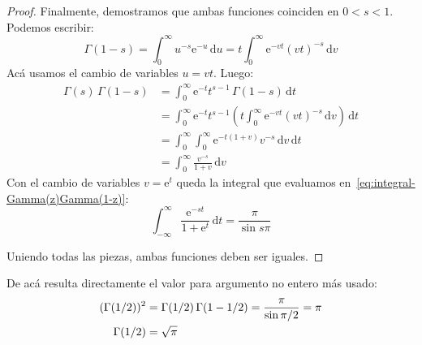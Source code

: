 \begin{proof}
    Finalmente,
    demostramos que ambas funciones coinciden en \(0 < s < 1\).
    Podemos escribir:
    \begin{equation*}
      \Gamma(1 - s)
	= \int_0^\infty u^{-s} \mathrm{e}^{-u} \, \mathrm{d} u
	= t \int_0^\infty \mathrm{e}^{-v t} (v t)^{-s}
	      \, \mathrm{d} v
    \end{equation*}
    Acá usamos el cambio de variables \(u = v t\).
    Luego:
    \begin{align*}
      \Gamma(s) \, \Gamma(1 - s)
	&= \int_0^\infty
	       \mathrm{e}^{-t} t^{s - 1} \, \Gamma(1 - s)
	     \, \mathrm{d} t \\
	&= \int_0^\infty
	     \mathrm{e}^{-t} t^{s - 1}
	       \left(
		 t \int_0^\infty \mathrm{e}^{- v t} (v t)^{-s}
		     \, \mathrm{d} v
	       \right) \, \mathrm{d} t \\
	&= \int_0^\infty
	     \int_0^\infty
	       \mathrm{e}^{-t (1 + v)} v^{-s} \,
		 \mathrm{d} v \, \mathrm{d} t \\
	&= \int_0^\infty \frac{v^{-s}}{1 + v} \, \mathrm{d} v
    \end{align*}
    Con el cambio de variables \(v = \mathrm{e}^t\)
    queda la integral que evaluamos
    en~\eqref{eq:integral-Gamma(z)Gamma(1-z)}:
    \begin{equation*}
      \int_{-\infty}^\infty
	\frac{\mathrm{e}^{- s t}}{1 + \mathrm{e}^t} \, \mathrm{d} t
	= \frac{\pi}{\sin s \pi}
    \end{equation*}

    Uniendo todas las piezas,
    ambas funciones deben ser iguales.
  \end{proof}
  De acá resulta directamente
  el valor para argumento no entero más usado:
  \begin{align}
    ( \Gamma( 1/2 ))^2
      &= \Gamma(1/2) \, \Gamma(1 - 1/2)
       = \frac{\pi}{\sin \pi / 2}
       = \pi \notag \\
    \Gamma(1/2)
      &= \sqrt{\pi} \label{eq:Gamma(1/2)}
  \end{align}

